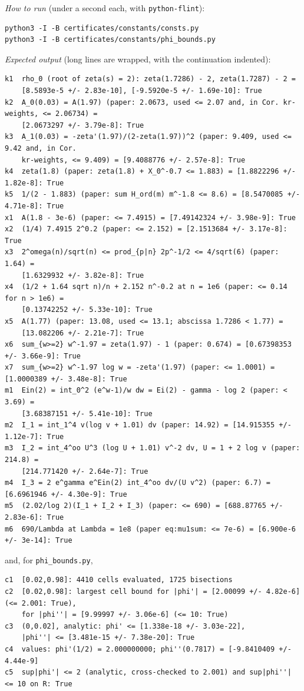 \emph{How to run} (under a second each, with \texttt{python-flint}):
\begingroup\footnotesize
\begin{verbatim}
python3 -I -B certificates/constants/consts.py
python3 -I -B certificates/constants/phi_bounds.py
\end{verbatim}
\endgroup
\emph{Expected output} (long lines are wrapped, with the continuation indented):
\begingroup\footnotesize
\begin{verbatim}
k1  rho_0 (root of zeta(s) = 2): zeta(1.7286) - 2, zeta(1.7287) - 2 =
    [8.5893e-5 +/- 2.83e-10], [-9.5920e-5 +/- 1.69e-10]: True
k2  A_0(0.03) = A(1.97) (paper: 2.0673, used <= 2.07 and, in Cor. kr-weights, <= 2.06734) =
    [2.0673297 +/- 3.79e-8]: True
k3  A_1(0.03) = -zeta'(1.97)/(2-zeta(1.97))^2 (paper: 9.409, used <= 9.42 and, in Cor.
    kr-weights, <= 9.409) = [9.4088776 +/- 2.57e-8]: True
k4  zeta(1.8) (paper: zeta(1.8) + X_0^-0.7 <= 1.883) = [1.8822296 +/- 1.82e-8]: True
k5  1/(2 - 1.883) (paper: sum H_ord(m) m^-1.8 <= 8.6) = [8.5470085 +/- 4.71e-8]: True
x1  A(1.8 - 3e-6) (paper: <= 7.4915) = [7.49142324 +/- 3.98e-9]: True
x2  (1/4) 7.4915 2^0.2 (paper: <= 2.152) = [2.1513684 +/- 3.17e-8]: True
x3  2^omega(n)/sqrt(n) <= prod_{p|n} 2p^-1/2 <= 4/sqrt(6) (paper: 1.64) =
    [1.6329932 +/- 3.82e-8]: True
x4  (1/2 + 1.64 sqrt n)/n + 2.152 n^-0.2 at n = 1e6 (paper: <= 0.14 for n > 1e6) =
    [0.13742252 +/- 5.33e-10]: True
x5  A(1.77) (paper: 13.08, used <= 13.1; abscissa 1.7286 < 1.77) =
    [13.082206 +/- 2.21e-7]: True
x6  sum_{w>=2} w^-1.97 = zeta(1.97) - 1 (paper: 0.674) = [0.67398353 +/- 3.66e-9]: True
x7  sum_{w>=2} w^-1.97 log w = -zeta'(1.97) (paper: <= 1.0001) = [1.0000389 +/- 3.48e-8]: True
m1  Ein(2) = int_0^2 (e^w-1)/w dw = Ei(2) - gamma - log 2 (paper: < 3.69) =
    [3.68387151 +/- 5.41e-10]: True
m2  I_1 = int_1^4 v(log v + 1.01) dv (paper: 14.92) = [14.915355 +/- 1.12e-7]: True
m3  I_2 = int_4^oo U^3 (log U + 1.01) v^-2 dv, U = 1 + 2 log v (paper: 214.8) =
    [214.771420 +/- 2.64e-7]: True
m4  I_3 = 2 e^gamma e^Ein(2) int_4^oo dv/(U v^2) (paper: 6.7) = [6.6961946 +/- 4.30e-9]: True
m5  (2.02/log 2)(I_1 + I_2 + I_3) (paper: <= 690) = [688.87765 +/- 2.83e-6]: True
m6  690/Lambda at Lambda = 1e8 (paper eq:mu1sum: <= 7e-6) = [6.900e-6 +/- 3e-14]: True
\end{verbatim}
\endgroup
and, for \texttt{phi\_bounds.py},
\begingroup\footnotesize
\begin{verbatim}
c1  [0.02,0.98]: 4410 cells evaluated, 1725 bisections
c2  [0.02,0.98]: largest cell bound for |phi'| = [2.00099 +/- 4.82e-6] (<= 2.001: True),
    for |phi''| = [9.99997 +/- 3.06e-6] (<= 10: True)
c3  (0,0.02], analytic: phi' <= [1.338e-18 +/- 3.03e-22],
    |phi''| <= [3.481e-15 +/- 7.38e-20]: True
c4  values: phi'(1/2) = 2.000000000; phi''(0.7817) = [-9.8410409 +/- 4.44e-9]
c5  sup|phi'| <= 2 (analytic, cross-checked to 2.001) and sup|phi''| <= 10 on R: True
\end{verbatim}
\endgroup


